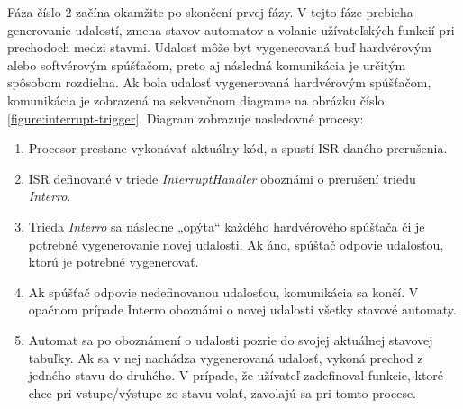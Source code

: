 Fáza číslo 2 začína okamžite po skončení prvej fázy. V tejto fáze prebieha generovanie  udalostí, zmena stavov automatov a volanie užívateľských funkcií pri prechodoch
medzi stavmi. Udalosť môže byť vygenerovaná buď hardvérovým alebo softvérovým spúšťačom,  preto aj následná komunikácia je určitým spôsobom rozdielna.
Ak bola udalosť vygenerovaná hardvérovým spúšťačom, komunikácia je zobrazená na sekvenčnom diagrame na obrázku číslo \ref{figure:interrupt-trigger}.
Diagram zobrazuje nasledovné procesy:
\begin{enumerate}
    \item Procesor prestane vykonávať aktuálny kód, a spustí ISR daného prerušenia.
    \item ISR definované v triede \textit{InterruptHandler} oboznámi o prerušení triedu \textit{Interro}.
    \item Trieda \textit{Interro} sa následne „opýta“ každého hardvérového spúšťača či je potrebné vygenerovanie novej udalosti. Ak áno, spúšťač odpovie udalosťou, ktorú je potrebné vygenerovať.
    \item Ak spúšťač odpovie nedefinovanou udalosťou, komunikácia sa končí. V opačnom prípade Interro oboznámi o novej udalosti všetky stavové automaty.
    \item Automat sa po oboznámení o udalosti pozrie do svojej aktuálnej stavovej tabuľky. Ak sa v nej nachádza vygenerovaná udalosť, vykoná prechod z jedného stavu do druhého.
          V prípade, že užívateľ zadefinoval funkcie, ktoré chce pri vstupe/výstupe zo stavu volať, zavolajú sa pri tomto procese.
\end{enumerate}

